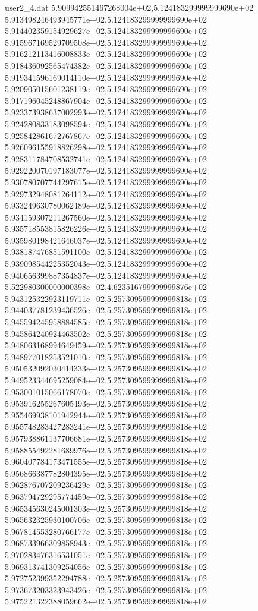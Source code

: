 \begin{filecontents}{user2_4.dat}
5.909942551467268004e+02,5.124183299999999690e+02
5.913498246493945771e+02,5.124183299999999690e+02
5.914402359154929627e+02,5.124183299999999690e+02
5.915967169529709508e+02,5.124183299999999690e+02
5.916212113416008833e+02,5.124183299999999690e+02
5.918436092565474382e+02,5.124183299999999690e+02
5.919341596169014110e+02,5.124183299999999690e+02
5.920905015601238119e+02,5.124183299999999690e+02
5.917196045248867904e+02,5.124183299999999690e+02
5.923373938637002993e+02,5.124183299999999690e+02
5.924280833183098594e+02,5.124183299999999690e+02
5.925842861672767867e+02,5.124183299999999690e+02
5.926096155918826298e+02,5.124183299999999690e+02
5.928311784708532741e+02,5.124183299999999690e+02
5.929220070197183077e+02,5.124183299999999690e+02
5.930780707744297615e+02,5.124183299999999690e+02
5.929732948081264112e+02,5.124183299999999690e+02
5.933249630780062489e+02,5.124183299999999690e+02
5.934159307211267560e+02,5.124183299999999690e+02
5.935718553815826226e+02,5.124183299999999690e+02
5.935980198421646037e+02,5.124183299999999690e+02
5.938187476851591100e+02,5.124183299999999690e+02
5.939098544225352043e+02,5.124183299999999690e+02
5.940656399887354837e+02,5.124183299999999690e+02
5.522980300000000398e+02,4.623516799999999876e+02
5.943125322923119711e+02,5.257309599999999818e+02
5.944037781239436526e+02,5.257309599999999818e+02
5.945594245958884585e+02,5.257309599999999818e+02
5.945864240924463502e+02,5.257309599999999818e+02
5.948063168994649459e+02,5.257309599999999818e+02
5.948977018253521010e+02,5.257309599999999818e+02
5.950532092030414333e+02,5.257309599999999818e+02
5.949523344695259084e+02,5.257309599999999818e+02
5.953001015066178070e+02,5.257309599999999818e+02
5.953916255267605493e+02,5.257309599999999818e+02
5.955469938101942944e+02,5.257309599999999818e+02
5.955748283427283241e+02,5.257309599999999818e+02
5.957938861137706681e+02,5.257309599999999818e+02
5.958855492281689976e+02,5.257309599999999818e+02
5.960407784173471555e+02,5.257309599999999818e+02
5.956866387782804395e+02,5.257309599999999818e+02
5.962876707209236429e+02,5.257309599999999818e+02
5.963794729295774459e+02,5.257309599999999818e+02
5.965345630245001303e+02,5.257309599999999818e+02
5.965632325930100706e+02,5.257309599999999818e+02
5.967814553280766177e+02,5.257309599999999818e+02
5.968733966309858943e+02,5.257309599999999818e+02
5.970283476316531051e+02,5.257309599999999818e+02
5.969313741309254056e+02,5.257309599999999818e+02
5.972752399352294788e+02,5.257309599999999818e+02
5.973673203323943426e+02,5.257309599999999818e+02
5.975221322388059662e+02,5.257309599999999818e+02

\end{filecontents}
